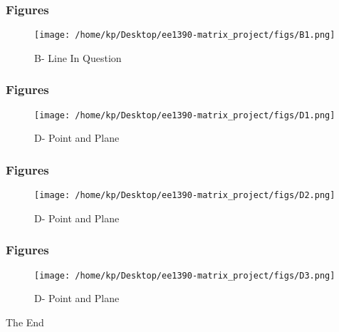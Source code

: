\documentclass{beamer}
\begin{document}

\begin{frame}
\frametitle{Figures}
\begin{figure}[H]
    \texttt{[image: /home/kp/Desktop/ee1390-matrix\_project/figs/B1.png]}
    \caption{B- Line In Question}
    \label{B}
\end{figure}
\end{frame}


\begin{frame}
\frametitle{Figures}
\begin{figure}[H]
    \texttt{[image: /home/kp/Desktop/ee1390-matrix\_project/figs/D1.png]}
    \caption{D- Point and Plane}
    \label{D}
\end{figure}
\end{frame}


\begin{frame}
\frametitle{Figures}
\begin{figure}[H]
    \texttt{[image: /home/kp/Desktop/ee1390-matrix\_project/figs/D2.png]}
    \caption{D- Point and Plane}
    \label{D}
\end{figure}
\end{frame}


\begin{frame}
\frametitle{Figures}
\begin{figure}[H]
    \texttt{[image: /home/kp/Desktop/ee1390-matrix\_project/figs/D3.png]}
    \caption{D- Point and Plane}
    \label{D}
\end{figure}
\end{frame}
 \begin{frame}
\Huge{\centerline{The End}}
\end{frame}
\end{document}
